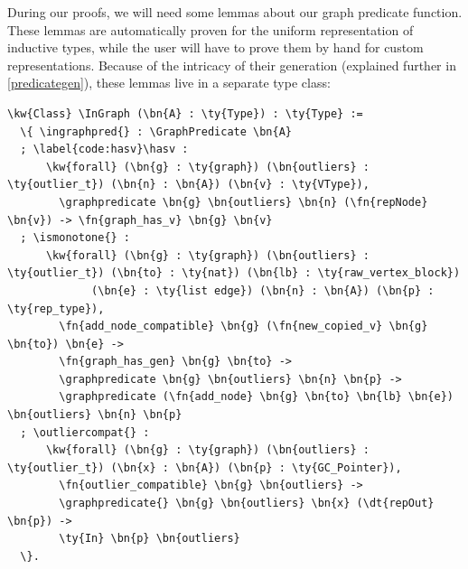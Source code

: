 During our proofs, we will need some lemmas about our graph predicate function. These lemmas are automatically proven for the uniform representation of inductive types, while the user will have to prove them by hand for custom representations. Because of the intricacy of their generation (explained further in \autoref{predicategen}), these lemmas live in a separate type class:

\newcommand{\InGraph}{\hyperref[code:InGraph]{\ty{InGraph}}}
\newcommand{\ingraphpred}{\hyperref[code:ingraphpred]{\fn{in\_\linebreak[0]graph\_\linebreak[0]pred}}}
\newcommand{\hasv}{\hyperref[code:hasv]{\fn{has\_v}}}
\newcommand{\ismonotone}{\hyperref[code:ismonotone]{\fn{is\_\linebreak[0]monotone}}}
\newcommand{\outliercompat}{\hyperref[code:outliercompat]{\fn{outlier\_\linebreak[0]compat}}}
\label{code:InGraph}
\label{code:ingraphpred}
\label{code:ismonotone}
\label{code:outliercompat}
\begin{Verbatim}
\kw{Class} \InGraph (\bn{A} : \ty{Type}) : \ty{Type} :=
  \{ \ingraphpred{} : \GraphPredicate \bn{A}
  ; \label{code:hasv}\hasv :
      \kw{forall} (\bn{g} : \ty{graph}) (\bn{outliers} : \ty{outlier_t}) (\bn{n} : \bn{A}) (\bn{v} : \ty{VType}),
        \graphpredicate \bn{g} \bn{outliers} \bn{n} (\fn{repNode} \bn{v}) -> \fn{graph_has_v} \bn{g} \bn{v}
  ; \ismonotone{} :
      \kw{forall} (\bn{g} : \ty{graph}) (\bn{outliers} : \ty{outlier_t}) (\bn{to} : \ty{nat}) (\bn{lb} : \ty{raw_vertex_block})
             (\bn{e} : \ty{list edge}) (\bn{n} : \bn{A}) (\bn{p} : \ty{rep_type}),
        \fn{add_node_compatible} \bn{g} (\fn{new_copied_v} \bn{g} \bn{to}) \bn{e} ->
        \fn{graph_has_gen} \bn{g} \bn{to} -> 
        \graphpredicate \bn{g} \bn{outliers} \bn{n} \bn{p} -> 
        \graphpredicate (\fn{add_node} \bn{g} \bn{to} \bn{lb} \bn{e}) \bn{outliers} \bn{n} \bn{p}
  ; \outliercompat{} : 
      \kw{forall} (\bn{g} : \ty{graph}) (\bn{outliers} : \ty{outlier_t}) (\bn{x} : \bn{A}) (\bn{p} : \ty{GC_Pointer}),
        \fn{outlier_compatible} \bn{g} \bn{outliers} ->
        \graphpredicate{} \bn{g} \bn{outliers} \bn{x} (\dt{repOut} \bn{p}) ->
        \ty{In} \bn{p} \bn{outliers}
  \}.
\end{Verbatim}

